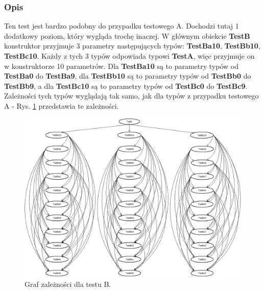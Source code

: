 \documentclass[12pt]{article}
\begin{document}
\subsubsection{Opis}
Ten test jest bardzo podobny do przypadku testowego A. Dochodzi tutaj 1 dodatkowy poziom, który wygląda trochę inaczej. W głównym obiekcie \textbf{TestB} konstruktor przyjmuje 3 parametry następujących typów: \textbf{TestBa10}, \textbf{TestBb10}, \textbf{TestBc10}. Każdy z tych 3 typów odpowiada typowi \textbf{TestA}, więc przyjmuje on w konstruktorze 10 parametrów. Dla \textbf{TestBa10} są to parametry typów od \textbf{TestBa0} do \textbf{TestBa9}, dla \textbf{TestBb10} są to parametry typów od \textbf{TestBb0} do \textbf{TestBb9}, a dla \textbf{TestBc10} są to parametry typów od \textbf{TestBc0} do \textbf{TestBc9}. Zależności tych typów wyglądają tak samo, jak dla typów z przypadku testowego A - Rys. \ref{fig:testB} przedstawia te zależności.\\
\begin{figure}[h]
	\begin{center}
  		\includegraphics[width=\linewidth]{TestB.png}
  		\caption{Graf zależności dla testu B.}
  		\label{fig:testB}
	\end{center}
\end{figure}
\end{document}
